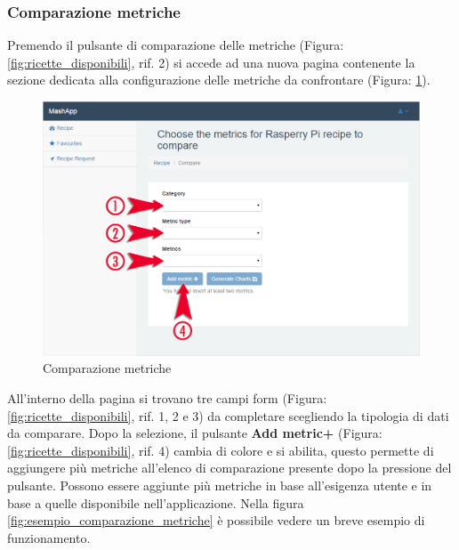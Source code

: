 		\subsubsection{Comparazione metriche} %
		\label{sec:comparazione_metriche}
			Premendo il pulsante di comparazione delle metriche\gloss{} (Figura: \ref{fig:ricette_disponibili}, rif. 2) si accede ad una nuova pagina contenente la sezione dedicata alla configurazione delle metriche\gloss{} da confrontare (Figura: \ref{fig:comparazione_metriche}).
			\begin{figure}[H]
				\centering
				\centerline{\includegraphics[width=14cm]{images/comparazione_metriche.png}}
				\caption{Comparazione metriche}
				\label{fig:comparazione_metriche}
			\end{figure}
			All'interno della pagina si trovano tre campi form\gloss{} (Figura: \ref{fig:ricette_disponibili}, rif. 1, 2 e 3) da completare scegliendo la tipologia di dati da comparare. Dopo la selezione, il pulsante \textbf{Add metric+} (Figura: \ref{fig:ricette_disponibili}, rif. 4) cambia di colore e si abilita, questo permette di aggiungere più metriche\gloss{} all'elenco di comparazione presente dopo la pressione del pulsante.\newline
			Possono essere aggiunte più metriche\gloss{} in base all'esigenza utente e in base a quelle disponibile nell'applicazione. Nella figura \ref{fig:esempio_comparazione_metriche} è possibile vedere un breve esempio di funzionamento.

